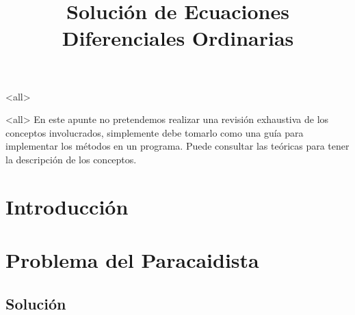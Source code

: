 \mode<all>









\title{
   Solución de Ecuaciones Diferenciales Ordinarias }
\subject{ Métodos de Euler y de Runge-Kutta}





\mode<all>
En este apunte no pretendemos realizar una revisión exhaustiva de los conceptos involucrados, 
simplemente debe tomarlo como una guía para implementar los métodos en un programa. Puede consultar
las teóricas para tener la descripción de los conceptos.

\section{Introducción}


\section{Problema del Paracaidista}

%
\subsection{Solución}


